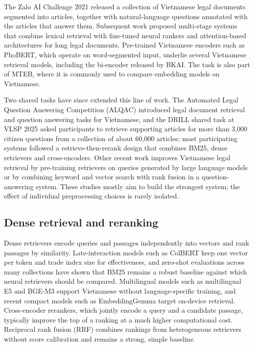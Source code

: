 \documentclass{ws-vjcs}
\begin{document}
The Zalo AI Challenge 2021 released a collection of Vietnamese legal documents segmented into articles, together with natural-language questions annotated with the articles that answer them.\cite{zalo2021legal} Subsequent work proposed multi-stage systems that combine lexical retrieval with fine-tuned neural rankers\cite{vnlegal2022multistage} and attention-based architectures for long legal documents.\cite{vnlegal2022attentive} Pre-trained Vietnamese encoders such as PhoBERT,\cite{nguyen2020phobert} which operate on word-segmented input, underlie several Vietnamese retrieval models, including the bi-encoder released by BKAI.\cite{bkai2023biencoder} The task is also part of MTEB,\cite{muennighoff2023mteb} where it is commonly used to compare embedding models on Vietnamese.

Two shared tasks have since extended this line of work. The Automated Legal Question Answering Competition (ALQAC) introduced legal document retrieval and question answering tasks for Vietnamese,\cite{nguyen2021alqac} and the DRILL shared task at VLSP 2025 asked participants to retrieve supporting articles for more than 3,000 citizen questions from a collection of about 60,000 articles; most participating systems followed a retrieve-then-rerank design that combines BM25, dense retrievers and cross-encoders.\cite{vuong2025drill} Other recent work improves Vietnamese legal retrieval by pre-training retrievers on queries generated by large language models\cite{pham2024synthetic} or by combining keyword and vector search with rank fusion in a question-answering system.\cite{ba2024legalqa} These studies mostly aim to build the strongest system; the effect of individual preprocessing choices is rarely isolated.

\subsection{Dense retrieval and reranking}

Dense retrievers encode queries and passages independently into vectors and rank passages by similarity.\cite{karpukhin2020dpr,reimers2019sbert} Late-interaction models such as ColBERT keep one vector per token and trade index size for effectiveness,\cite{khattab2020colbert} and zero-shot evaluations across many collections have shown that BM25 remains a robust baseline against which neural retrievers should be compared.\cite{thakur2021beir} Multilingual models such as multilingual E5\cite{wang2024me5} and BGE-M3\cite{chen2024bgem3} support Vietnamese without language-specific training, and recent compact models such as EmbeddingGemma\cite{vera2025embeddinggemma,gemma2emb} target on-device retrieval. Cross-encoder rerankers, which jointly encode a query and a candidate passage, typically improve the top of a ranking at a much higher computational cost.\cite{nogueira2019passage} Reciprocal rank fusion (RRF) combines rankings from heterogeneous retrievers without score calibration and remains a strong, simple baseline.\cite{cormack2009rrf}
\end{document}
